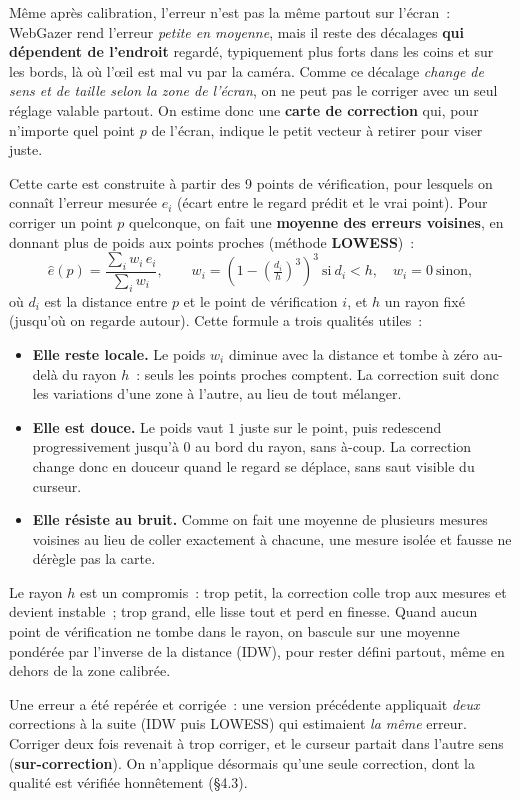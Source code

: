 \documentclass[11pt,a4paper]{article}
\begin{document}
Même après calibration, l'erreur n'est pas la même partout sur l'écran~: WebGazer rend
l'erreur \emph{petite en moyenne}, mais il reste des décalages \textbf{qui dépendent de
l'endroit} regardé, typiquement plus forts dans les coins et sur les bords, là où l'œil
est mal vu par la caméra. Comme ce décalage \emph{change de sens et de taille selon la
zone de l'écran}, on ne peut pas le corriger avec un seul réglage valable partout. On
estime donc une \textbf{carte de correction} qui, pour n'importe quel point $p$ de
l'écran, indique le petit vecteur à retirer pour viser juste.

Cette carte est construite à partir des 9 points de vérification, pour lesquels on
connaît l'erreur mesurée $e_i$ (écart entre le regard prédit et le vrai point). Pour
corriger un point $p$ quelconque, on fait une \textbf{moyenne des erreurs voisines},
en donnant plus de poids aux points proches (méthode \textbf{LOWESS})~:
\[
\hat{e}(p) = \frac{\sum_i w_i\, e_i}{\sum_i w_i}, \qquad
w_i = \left(1 - \left(\tfrac{d_i}{h}\right)^3\right)^3 \ \text{si}\ d_i < h,
\quad w_i = 0 \ \text{sinon},
\]
où $d_i$ est la distance entre $p$ et le point de vérification $i$, et $h$ un rayon
fixé (jusqu'où on regarde autour). Cette formule a trois qualités utiles~:
\begin{itemize}[leftmargin=1.4em]
  \item \textbf{Elle reste locale.} Le poids $w_i$ diminue avec la distance et tombe à
  zéro au-delà du rayon $h$~: seuls les points proches comptent. La correction suit donc
  les variations d'une zone à l'autre, au lieu de tout mélanger.
  \item \textbf{Elle est douce.} Le poids vaut $1$ juste sur le point, puis redescend
  progressivement jusqu'à $0$ au bord du rayon, sans à-coup. La correction change donc
  en douceur quand le regard se déplace, sans saut visible du curseur.
  \item \textbf{Elle résiste au bruit.} Comme on fait une moyenne de plusieurs mesures
  voisines au lieu de coller exactement à chacune, une mesure isolée et fausse ne
  dérègle pas la carte.
\end{itemize}
Le rayon $h$ est un compromis~: trop petit, la correction colle trop aux mesures et
devient instable~; trop grand, elle lisse tout et perd en finesse. Quand aucun point de
vérification ne tombe dans le rayon, on bascule sur une moyenne pondérée par l'inverse
de la distance (IDW), pour rester défini partout, même en dehors de la zone calibrée.

Une erreur a été repérée et corrigée~: une version précédente appliquait \emph{deux}
corrections à la suite (IDW puis LOWESS) qui estimaient \emph{la même} erreur. Corriger
deux fois revenait à trop corriger, et le curseur partait dans l'autre sens
(\textbf{sur-correction}). On n'applique désormais qu'une seule correction, dont la
qualité est vérifiée honnêtement (§4.3).
\end{document}
